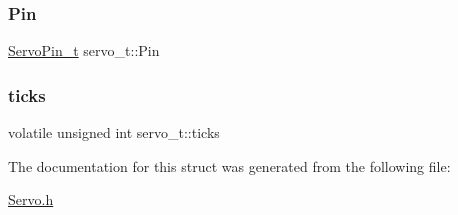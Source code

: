 \subsubsection{\texorpdfstring{Pin}{Pin}}
{\footnotesize\ttfamily \hyperlink{struct_servo_pin__t}{Servo\+Pin\+\_\+t} servo\+\_\+t\+::\+Pin}

\mbox{\label{structservo__t_a9405b5e5266318f889ef6ff95a97943b}} 
\subsubsection{\texorpdfstring{ticks}{ticks}}
{\footnotesize\ttfamily volatile unsigned int servo\+\_\+t\+::ticks}



The documentation for this struct was generated from the following file\+:\begin{DoxyCompactItemize}
\item 
\hyperlink{_servo_8h}{Servo.\+h}\end{DoxyCompactItemize}
